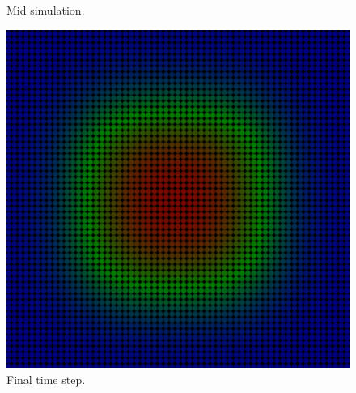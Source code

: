 \documentclass[xcolor=dvipsnames,10pt,aspectratio=169]{beamer}
\begin{document}
\begin{frame}
\begin{minipage}[h!]{0.30\textwidth}
\begin{figure}[h!]
			\caption{Mid simulation.}
		\end{figure}
	\end{minipage}
	\begin{minipage}[h!]{0.30\textwidth}
		\begin{figure}[h!]
			\centering
			\includegraphics[trim = {1cm 1cm 1cm 1cm}, clip , angle=0, scale=0.3]{figuras/sucesso_3}
			\caption{Final time step.}
		\end{figure}
	\end{minipage}
\end{frame}
\end{document}
